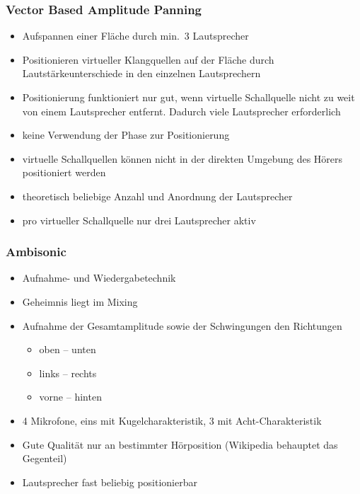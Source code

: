 \documentclass[a4paper, 12pt]{article}
\begin{document}
\subsubsection*{Vector Based Amplitude Panning}
\begin{itemize}
  \item Aufspannen einer Fläche durch min.\ 3 Lautsprecher
  \item Positionieren virtueller Klangquellen auf der Fläche durch Lautstärkeunterschiede in den einzelnen Lautsprechern
\end{itemize}
\begin{itemize}
  \renewcommand{\labelitemi}{\(-\)}%
  \item Positionierung funktioniert nur gut, wenn virtuelle Schallquelle nicht zu weit von einem Lautsprecher entfernt. Dadurch viele Lautsprecher erforderlich
  \item keine Verwendung der Phase zur Positionierung
  \item virtuelle Schallquellen können nicht in der direkten Umgebung des Hörers positioniert werden
\end{itemize}
\begin{itemize}
  \renewcommand{\labelitemi}{+}%
  \item theoretisch beliebige Anzahl und Anordnung der Lautsprecher
  \item pro virtueller Schallquelle nur drei Lautsprecher aktiv
\end{itemize}

\subsubsection*{Ambisonic}
\begin{itemize}
  \item Aufnahme- und Wiedergabetechnik
  \item Geheimnis liegt im Mixing
  \item Aufnahme der Gesamtamplitude sowie der Schwingungen den Richtungen
    \begin {itemize}
      \item oben -- unten
      \item links -- rechts
      \item vorne -- hinten
    \end{itemize}
  \item 4 Mikrofone, eins mit Kugelcharakteristik, 3 mit Acht-Charakteristik
\end{itemize}
\begin{itemize}
  \renewcommand{\labelitemi}{\(-\)}%
  \item Gute Qualität nur an bestimmter Hörposition (Wikipedia behauptet das Gegenteil)
\end{itemize}
\begin{itemize}
  \renewcommand{\labelitemi}{+}%
  \item Lautsprecher fast beliebig positionierbar
\end{itemize}
\end{document}
